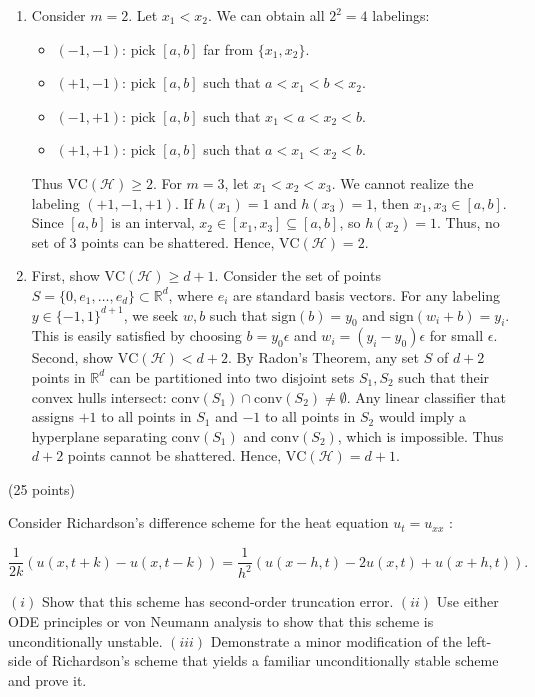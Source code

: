 \begin{solution}
\begin{enumerate}
    \item[(i)] Consider $m=2$. Let $x_1 < x_2$. We can obtain all $2^2=4$ labelings:
    \begin{itemize}
        \item $(-1, -1)$: pick $[a, b]$ far from $\{x_1, x_2\}$.
        \item $(+1, -1)$: pick $[a, b]$ such that $a < x_1 < b < x_2$.
        \item $(-1, +1)$: pick $[a, b]$ such that $x_1 < a < x_2 < b$.
        \item $(+1, +1)$: pick $[a, b]$ such that $a < x_1 < x_2 < b$.
    \end{itemize}
    Thus $\text{VC}(\mathcal{H}) \geq 2$.
    For $m=3$, let $x_1 < x_2 < x_3$. We cannot realize the labeling $(+1, -1, +1)$. If $h(x_1)=1$ and $h(x_3)=1$, then $x_1, x_3 \in [a, b]$. Since $[a, b]$ is an interval, $x_2 \in [x_1, x_3] \subseteq [a, b]$, so $h(x_2)=1$. Thus, no set of 3 points can be shattered. Hence, $\text{VC}(\mathcal{H}) = 2$.

    \item[(ii)] First, show $\text{VC}(\mathcal{H}) \geq d+1$. Consider the set of points $S = \{0, e_1, \dots, e_d\} \subset \mathbb{R}^d$, where $e_i$ are standard basis vectors. For any labeling $y \in \{-1, 1\}^{d+1}$, we seek $w, b$ such that $\text{sign}(b) = y_0$ and $\text{sign}(w_i + b) = y_i$. This is easily satisfied by choosing $b = y_0 \epsilon$ and $w_i = (y_i - y_0) \epsilon$ for small $\epsilon$.
    Second, show $\text{VC}(\mathcal{H}) < d+2$. By Radon's Theorem, any set $S$ of $d+2$ points in $\mathbb{R}^d$ can be partitioned into two disjoint sets $S_1, S_2$ such that their convex hulls intersect: $\text{conv}(S_1) \cap \text{conv}(S_2) \neq \emptyset$. Any linear classifier that assigns $+1$ to all points in $S_1$ and $-1$ to all points in $S_2$ would imply a hyperplane separating $\text{conv}(S_1)$ and $\text{conv}(S_2)$, which is impossible. Thus $d+2$ points cannot be shattered. Hence, $\text{VC}(\mathcal{H}) = d+1$.
\end{enumerate}
\end{solution}

\begin{exercise}
\label{applied:2019:2}
(25 points)

Consider Richardson’s difference scheme for the heat equation $u _ { t } = u _ { x x }$ :

\[
\frac {1}{2 k} \left(u (x, t + k) - u (x, t - k)\right) = \frac {1}{h ^ {2}} \left(u (x - h, t) - 2 u (x, t) + u (x + h, t)\right).
\]

$( i )$ Show that this scheme has second-order truncation error.   
$( i i )$ Use either ODE principles or von Neumann analysis to show that this scheme is unconditionally unstable.   
$( i i i )$ Demonstrate a minor modification of the left-side of Richardson’s scheme that yields a familiar unconditionally stable scheme and prove it.
\end{exercise}

